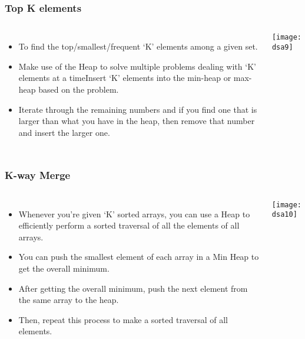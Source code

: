\begin{frame}[fragile]
	\frametitle{Top K elements}
	\begin{columns}[T]
 	
\begin{itemize}
			\item To find the top/smallest/frequent ‘K’ elements among a given set. 			
			\item Make use of the Heap to solve multiple problems dealing with ‘K’ elements at a timeInsert ‘K’ elements into the min-heap or max-heap based on the problem.
			\item Iterate through the remaining numbers and if you find one that is larger than what you have in the heap, then remove that number and insert the larger one.
			\end{itemize}

			
		
\begin{center}
\texttt{[image: dsa9]}
\end{center}		
		\end{columns}		
\end{frame}



\begin{frame}[fragile]
	\frametitle{K-way Merge}
	\begin{columns}[T]
 	
\begin{itemize}
			\item Whenever you’re given ‘K’ sorted arrays, you can use a Heap to efficiently perform a sorted traversal of all the elements of all arrays. 			
			\item You can push the smallest element of each array in a Min Heap to get the overall minimum. 
			\item After getting the overall minimum, push the next element from the same array to the heap. 
			\item Then, repeat this process to make a sorted traversal of all elements.
			\end{itemize}

			
		
\begin{center}
\texttt{[image: dsa10]}
\end{center}		
		\end{columns}		
\end{frame}




